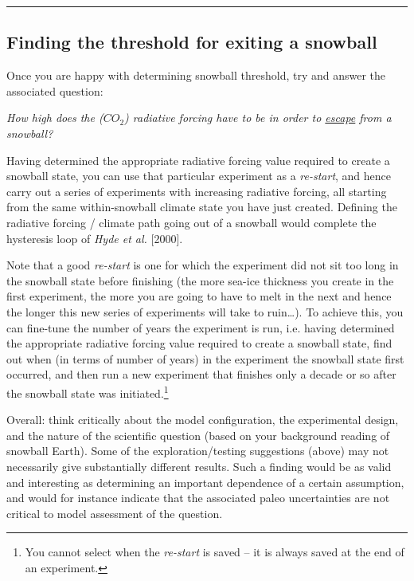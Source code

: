 \vspace{1mm}\noindent\rule{4cm}{0.5pt}\vspace{2mm}

\newpage

\subsection{Finding the threshold for exiting a snowball}

\noindent Once you are happy  with determining snowball threshold, try and answer the associated question:

\vspace{2mm}
\noindent \textit{How high does the (\(CO_{2}\)) radiative forcing have to be in order to \uline{escape} from a snowball?}
\vspace{2mm}

\noindent Having determined the appropriate radiative forcing value required to create a snowball state, you can use that particular experiment as a \textit{re-start}, and hence carry out a series of experiments with increasing radiative forcing, all starting from the same within-snowball climate state you have just created. Defining the radiative forcing / climate path going out of a snowball would complete the hysteresis loop of \textit{Hyde et al.} [2000]. 

Note that a good \textit{re-start} is one for which the experiment did not sit too long in the snowball state before finishing (the more sea-ice thickness you create in the first experiment, the more you are going to have to melt in the next and hence the longer this new series of experiments will take to ruin…). To achieve this, you can fine-tune the number of years the experiment is run, i.e. having determined the appropriate radiative forcing value required to create a snowball state, find out when (in terms of number of years) in the experiment the snowball state first occurred, and then run a new experiment that finishes only a decade or so after the snowball state was initiated.\footnote{You cannot select when the \textit{re-start} is saved – it is always saved at the end of an experiment.}

Overall: think critically about the model configuration, the experimental design, and the nature of the scientific question (based on your background reading of snowball Earth). Some of the exploration/testing suggestions (above) may not necessarily give substantially different results. Such a finding would be as valid and interesting as determining an important dependence of a certain assumption, and would for instance indicate that the associated paleo uncertainties are not critical to model assessment of the question.

